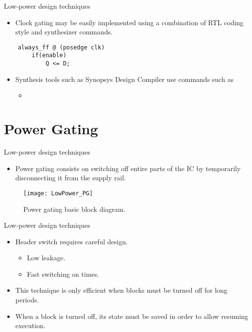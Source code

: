 \documentclass[]{slides}
\begin{document}
\begin{frame}[fragile]{Low-power design techniques}{}
\begin{itemize}
\item Clock gating may be easily implemented using a combination of \ac{RTL} coding style and synthesizer commands.
\end{itemize}
    \lstset{
    numbers=none,
    captionpos=t,
    title=Clock gating in RTL,
    xleftmargin=.2\textwidth, xrightmargin=.2\textwidth
  }
  \begin{lstlisting}
    always_ff @ (posedge clk)
        if(enable)
            Q <= D;
  \end{lstlisting}
  
\begin{itemize}
\item Synthesis tools such as Synopsys Design Compiler use commands such as
\begin{itemize}
  \item[] 
\end{itemize}
 
\end{itemize}

\end{frame}

\section{Power Gating}
\begin{frame}{Low-power design techniques}{}
\begin{itemize}
\item Power gating consists on switching off entire parts of the \ac{IC} by temporarily disconnecting it from the supply rail.
\end{itemize}
\begin{figure}
\texttt{[image: LowPower\_PG]}
\caption{Power gating basic block diagram.}
\label{Figure:PG_block}
\end{figure}
\end{frame}

\begin{frame}{Low-power design techniques}{}
\begin{itemize}
\item Header switch  requires careful design.
\begin{itemize}
  \item Low leakage.
  \item Fast switching on times.
\end{itemize}
\item This technique is only efficient when blocks must be turned off for long periods.
\item When a block is turned off, its state must be saved in order to allow resuming execution.
\end{itemize}

\end{frame}
\end{document}
